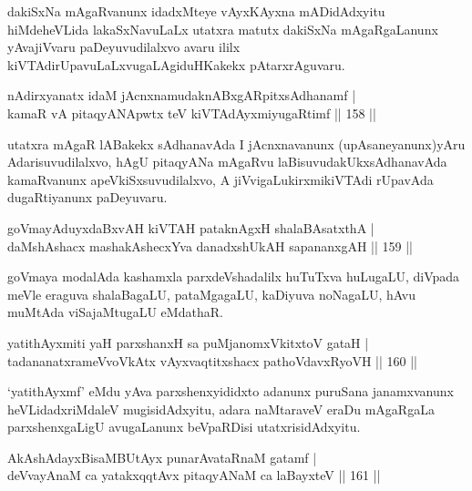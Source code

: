 \begin{artha}
dakiSxNa mAgaRvanunx idadxMteye vAyxKAyxna mADidAdxyitu hiMdeheVLida lakaSxNavuLaLx utatxra matutx dakiSxNa mAgaRgaLanunx yAvajiVvaru paDeyuvudilalxvo avaru ililx kiVTAdirUpavuLaLxvugaLAgiduHKakekx pAtarxrAguvaru.
\end{artha}


\begin{shl}
nA\s \s dirxyanatx idaM jAcnxnamudaknABxgARpitxsAdhanamf | \\
kamaR vA pitaqyANApwtx teV kiVTAdAyxmiyugaRtimf \hfill|| 158 || 
\end{shl}

\begin{artha}
utatxra mAgaR lABakekx sAdhanavAda I jAcnxnavanunx (upAsaneyanunx)yAru Adarisuvudilalxvo, hAgU pitaqyANa mAgaRvu laBisuvudakUkxsAdhanavAda kamaRvanunx apeVkiSxsuvudilalxvo, A jiVvigaLukirxmikiVTAdi rUpavAda dugaRtiyanunx paDeyuvaru.
\end{artha}

\begin{shl}
goVmayAduyxdaBxvAH kiVTAH pataknAgxH shalaBAsatxthA | \\
daMshAshacx mashakAshecxYva danadxshUkAH sapananxgAH \hfill|| 159 || 
\end{shl}

\begin{artha}
goVmaya modalAda kashamxla parxdeVshadalilx huTuTxva huLugaLU, diVpada meVle eraguva shalaBagaLU, pataMgagaLU, kaDiyuva noNagaLU, hAvu muMtAda viSajaMtugaLU eMdathaR.
\end{artha}


\begin{shl}
yatithAyxmiti yaH parxshanxH sa puMjanomxVkitxtoV gataH | \\
tadananatxrameVvoVkAtx vAyxvaqtitxshacx pathoVdavxRyoVH \hfill|| 160 || 
\end{shl}

\begin{artha}
`yatithAyxmf' eMdu yAva parxshenxyididxto adanunx puruSana janamxvanunx heVLidadxriMdaleV mugisidAdxyitu, adara naMtaraveV eraDu mAgaRgaLa parxshenxgaLigU avugaLanunx beVpaRDisi utatxrisidAdxyitu.
\end{artha}

\begin{shl}
AkAshAdayxBisaMBUtAyx punarAvataRnaM gatamf | \\
deVvayAnaM ca yatakxqqtAvx pitaqyANaM ca laBayxteV \hfill|| 161 || 
\end{shl}

